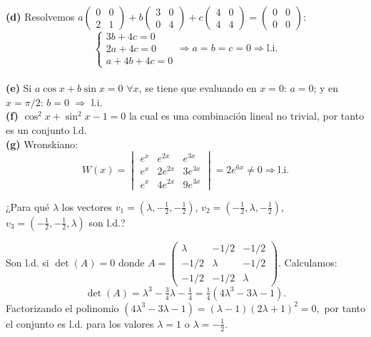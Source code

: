 \begin{prob}
\begin{myproof}
\textbf{(d)} Resolvemos $a\begin{pmatrix}0&0\\2&1\end{pmatrix} + b\begin{pmatrix}3&0\\0&4\end{pmatrix} + c\begin{pmatrix}4&0\\4&4\end{pmatrix} = \begin{pmatrix}0&0\\0&0\end{pmatrix}$:
$$\begin{cases} 3b + 4c = 0 \\ 2a + 4c = 0 \\ a + 4b + 4c = 0 \end{cases} \Rightarrow a=b=c=0 \Rightarrow \text{l.i.}$$ \\
\textbf{(e)} Si $a\cos x + b\sin x = 0$ $\forall x$, se tiene que evaluando en $x=0$: $a=0$; y en $x=\pi/2$: $b=0$ $\Rightarrow$ l.i. \\
\textbf{(f)} $\cos^2x + \sin^2x - 1 = 0$ la cual es una combinación lineal no trivial, por tanto es un conjunto l.d. \\
\textbf{(g)} Wronskiano:
$$W(x) = \begin{vmatrix}
e^x & e^{2x} & e^{3x} \\
e^x & 2e^{2x} & 3e^{3x} \\
e^x & 4e^{2x} & 9e^{3x}
\end{vmatrix} = 2e^{6x} \neq 0 \Rightarrow \text{l.i.}$$
\end{myproof}
\end{prob}

\begin{prob} ¿Para qué $\lambda$ los vectores $v_1=(\lambda,-\frac{1}{2},-\frac{1}{2})$, $v_2=(-\frac{1}{2},\lambda,-\frac{1}{2})$, $v_3=(-\frac{1}{2},-\frac{1}{2},\lambda)$ son l.d.?

\begin{myproof}
Son l.d. si $\det(A) = 0$ donde $A = \begin{pmatrix}
\lambda & -1/2 & -1/2 \\
-1/2 & \lambda & -1/2 \\
-1/2 & -1/2 & \lambda
\end{pmatrix}$. Calculamos:
$$\det(A) = \lambda^3 - \tfrac{3}{4}\lambda - \tfrac{1}{4} = \tfrac{1}{4}(4\lambda^3 - 3\lambda - 1).$$
Factorizando el polinomio $(4\lambda^3 - 3\lambda - 1) = (\lambda-1)(2\lambda+1)^2 = 0,$ por tanto el conjunto es l.d. para los valores $\lambda = 1 \text{ o } \lambda = -\frac{1}{2}.$
\end{myproof}
\end{prob}

